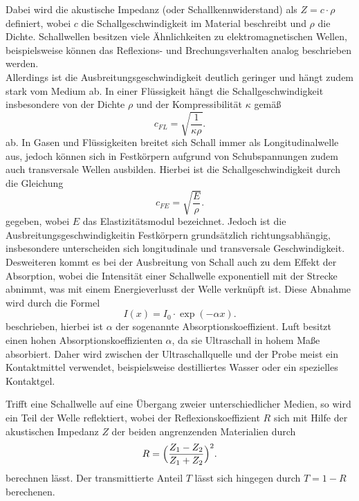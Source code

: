 Dabei wird die akustische Impedanz (oder Schallkennwiderstand) als $Z=c\cdot\rho$
definiert, wobei $c$ die Schallgeschwindigkeit im Material beschreibt und $\rho$
die Dichte.
Schallwellen besitzen viele Ähnlichkeiten zu elektromagnetischen Wellen,
beispielsweise können das Reflexions- und Brechungsverhalten analog beschrieben werden. \\
Allerdings ist die Ausbreitungsgeschwindigkeit deutlich geringer und hängt zudem
stark vom Medium ab. In einer Flüssigkeit hängt die Schallgeschwindigkeit insbesondere von der Dichte $\rho$ und der Kompressibilität $\kappa$
gemäß
\begin{equation}
  c_{FL}=\sqrt{\frac{1}{\kappa \rho}}.
  \label{cfl}
\end{equation}
ab. In Gasen und Flüssigkeiten breitet sich Schall immer als Longitudinalwelle aus,
jedoch können sich in Festkörpern aufgrund von Schubspannungen zudem auch
transversale Wellen ausbilden. Hierbei ist die Schallgeschwindigkeit durch die Gleichung
\begin{equation}
  c_{FE}=\sqrt{\frac{E}{\rho}}.
  \label{cfest}
\end{equation}
gegeben, wobei $E$ das Elastizitätsmodul bezeichnet. Jedoch ist die Ausbreitungsgeschwindigkeitin Festkörpern
grundsätzlich richtungsabhängig, insbesondere unterscheiden sich longitudinale und transversale Geschwindigkeit.
\\
Desweiteren kommt es bei der Ausbreitung von Schall auch zu dem Effekt der Absorption, wobei
die  Intensität einer Schallwelle exponentiell mit der Strecke abnimmt, was mit einem Energieverlusst
der Welle verknüpft ist. Diese Abnahme wird durch die Formel
\begin{equation}
  I(x)=I_0\cdot \exp{(-\alpha x)}.
  \label{eqn:intensität}
\end{equation}
beschrieben, hierbei ist $\alpha$ der sogenannte Absorptionskoeffizient.
Luft besitzt einen hohen Absorptionskoeffizienten $\alpha$, da sie Ultraschall in hohem
Maße absorbiert.
Daher wird zwischen der Ultraschallquelle und der Probe meist ein Kontaktmittel verwendet, beispielsweise
destilliertes Wasser oder ein spezielles Kontaktgel.

Trifft eine Schallwelle auf eine Übergang zweier unterschiedlicher Medien, so wird ein Teil der
Welle reflektiert, wobei der
Reflexionskoeffizient $R$ sich mit Hilfe der akustischen Impedanz $Z$
der beiden angrenzenden Materialien durch
\begin{equation}
  R=\Bigl(\frac{Z_1 -Z_2}{Z_1 +Z_2}\Bigr)^{2}.
  \label{refexion}
\end{equation}
berechnen lässt.
Der transmittierte Anteil $T$ lässt sich hingegen durch $T=1-R$ berechenen.


